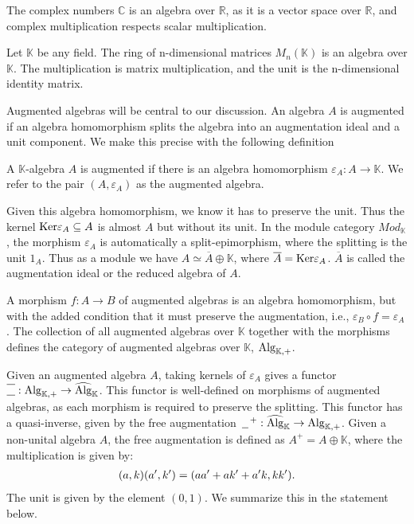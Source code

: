 \documentclass[../thesis.tex]{subfiles}
\begin{document}
            \begin{example}
                The complex numbers $\mathbb{C}$ is an algebra over $\mathbb{R}$, as it is a vector space over $\mathbb{R}$, and complex multiplication respects scalar multiplication.
            \end{example}

            \begin{example}
                Let $\mathbb{K}$ be any field. The ring of n-dimensional matrices $M_n(\mathbb{K})$ is an algebra over $\mathbb{K}$. The multiplication is matrix multiplication, and the unit is the n-dimensional identity matrix.
            \end{example}

            Augmented algebras will be central to our discussion. An algebra $A$ is augmented if an algebra homomorphism splits the algebra into an augmentation ideal and a unit component. We make this precise with the following definition

            \begin{definition}
                A $\mathbb{K}$-algebra $A$ is augmented if there is an algebra homomorphism $\varepsilon_A: A \rightarrow \mathbb{K}$. We refer to the pair $(A,\varepsilon_A)$ as the augmented algebra.
            \end{definition}

            Given this algebra homomorphism, we know it has to preserve the unit. Thus the kernel $\tt{Ker}\varepsilon_A \subseteq A$ is almost $A$ but without its unit. In the module category $Mod_\mathbb{K}$, the morphism $\varepsilon_A$ is automatically a split-epimorphism, where the splitting is the unit $1_A$. Thus as a module we have $A \simeq \overline{A}\oplus\mathbb{K}$, where $\overline{A} = \tt{Ker}\varepsilon_A$. $\overline{A}$ is called the augmentation ideal or the reduced algebra of $A$.

            A morphism $f: A \rightarrow B$ of augmented algebras is an algebra homomorphism, but with the added condition that it must preserve the augmentation, i.e., $\varepsilon_B \circ f = \varepsilon_A$. The collection of all augmented algebras over $\mathbb{K}$ together with the morphisms defines the category of augmented algebras over $\mathbb{K}$, $\tt{Alg}_{\mathbb{K},+}$.

            Given an augmented algebra $A$, taking kernels of $\varepsilon_A$ gives a functor $\overline{\underline{\phantom{A}}} : \tt{Alg}_{\mathbb{K},+} \rightarrow \widehat{\tt{Alg}}_\mathbb{K}$. This functor is well-defined on morphisms of augmented algebras, as each morphism is required to preserve the splitting. This functor has a quasi-inverse, given by the free augmentation $\argument^+: \widehat{\tt{Alg}}_\mathbb{K} \rightarrow \tt{Alg}_{\mathbb{K},+}$. Given a non-unital algebra $A$, the free augmentation is defined as $A^+ = A\oplus\mathbb{K}$, where the multiplication is given by:
            \begin{align*}
                (a,k)(a',k') = (aa' + ak' + a'k, kk')\tt{.}
            \end{align*}
            The unit is given by the element $(0,1)$. We summarize this in the statement below.
            
\end{document}
